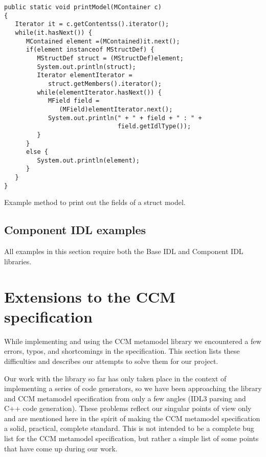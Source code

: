 \begin{Example}
\begin{minifbox}
\begin{small}
\begin{verbatim}
public static void printModel(MContainer c)
{
   Iterator it = c.getContentss().iterator();
   while(it.hasNext()) {
      MContained element =(MContained)it.next();
      if(element instanceof MStructDef) {
         MStructDef struct = (MStructDef)element;
         System.out.println(struct);
         Iterator elementIterator =
            struct.getMembers().iterator();
         while(elementIterator.hasNext()) {
            MField field =
               (MField)elementIterator.next();
            System.out.println(" + " + field + " : " +
                               field.getIdlType());
         }
      }
      else {
         System.out.println(element);
      }
   }
}
\end{verbatim}
\end{small}
\end{minifbox}
\caption{Example method to print out the fields of a struct model.}
\label{example:metamodel-baseidl-struct-print}
\end{Example}

\subsection{Component IDL examples}

All examples in this section require both the Base IDL and Component IDL
libraries.

\section{Extensions to the CCM specification}

While implementing and using the CCM metamodel library we encountered a few
errors, typos, and shortcomings in the specification. This section lists these
difficulties and describes our attempts to solve them for our project.

Our work with the library so far has only taken place in the context of
implementing a series of code generators, so we have been approaching the
library and CCM metamodel specification from only a few angles (IDL3 parsing and
C++ code generation). These problems reflect our singular points of view only
and are mentioned here in the spirit of making the CCM metamodel specification a
solid, practical, complete standard. This is not intended to be a complete bug
list for the CCM metamodel specification, but rather a simple list of some
points that have come up during our work.

